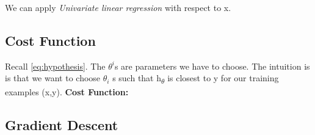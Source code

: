 \documentclass[letter]{article}
\begin{document}
           We can apply \emph{Univariate linear regression} with respect to x. 
    \subsection{Cost Function}

    Recall \ref{eq:hypothesis}. The $\theta^i$s are parameters we have to choose. The intuition is is that we want to choose $\theta_i$ s such that h\textsubscript{$\theta$} is closest to y for our training examples (x,y).
    \textbf{Cost Function:}

      
   
    
    \subsection{Gradient Descent}
\end{document}
